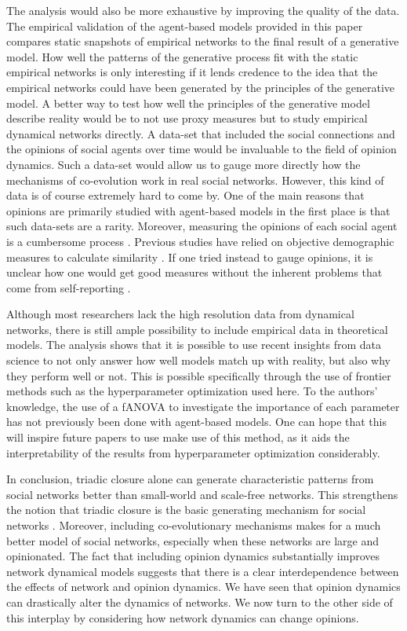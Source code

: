 \documentclass[11pt]{article}
\begin{document}
The analysis would also be more exhaustive by improving the quality of the data. The empirical validation of the agent-based models provided in this paper compares static snapshots of empirical networks to the final result of a generative model. How well the patterns of the generative process fit with the static empirical networks is only interesting if it lends credence to the idea that the empirical networks could have been generated by the principles of the generative model. 
A better way to test how well the principles of the generative model describe reality would be to not use proxy measures but to study empirical dynamical networks directly. A data-set that included the social connections and the opinions of social agents over time would be invaluable to the field of opinion dynamics. Such a data-set would allow us to gauge more directly how the mechanisms of co-evolution work in real social networks. 
However, this kind of data is of course extremely hard to come by. One of the main reasons that opinions are primarily studied with agent-based models in the first place is that such data-sets are a rarity. Moreover, measuring the opinions of each social agent is a cumbersome process \cite{chartishvili2019approach}. Previous studies have relied on objective demographic measures to calculate similarity \cite{kossinets_origins_2009, bener_empirical_2016}. If one tried instead to gauge opinions, it is unclear how one would get good measures without the inherent problems that come from self-reporting \cite{best2007measuring}. 

Although most researchers lack the high resolution data from dynamical networks, there is still ample possibility to include empirical data in theoretical models. 
The analysis shows that it is possible to use recent insights from data science to not only answer how well models match up with reality, but also why they perform well or not. 
This is possible specifically through the use of frontier methods such as the hyperparameter optimization used here. To the authors' knowledge, the use of a fANOVA to investigate the importance of each parameter has not previously been done with agent-based models.
One can hope that this will inspire future papers to use make use of this method, as it aids the interpretability of the results from hyperparameter optimization considerably. 

\noindent In conclusion, triadic closure alone can generate characteristic patterns from social networks better than small-world and scale-free networks. This strengthens the notion that triadic closure is the basic generating mechanism for social networks \cite{ilany_social_2016,jacksonmeeting2007, jacksonsearch2004}. Moreover, including co-evolutionary mechanisms makes for a much better model of social networks, especially when these networks are large and opinionated. 
The fact that including opinion dynamics substantially improves network dynamical models suggests that there is a clear interdependence between the effects of network and opinion dynamics. We have seen that opinion dynamics can drastically alter the dynamics of networks. We now turn to the other side of this interplay by considering how network dynamics can change opinions.
\end{document}
